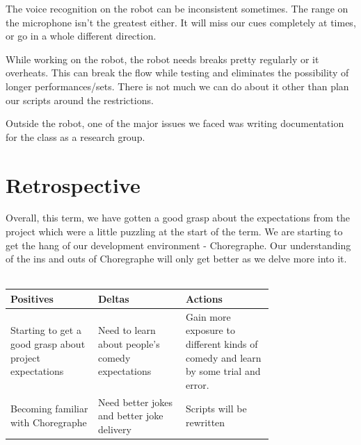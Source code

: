 \documentclass[onecolumn, draftclsnofoot,10pt, compsoc]{IEEEtran}
\begin{document}
The voice recognition on the robot can be inconsistent sometimes. The range on the microphone isn't the greatest either. It will miss our cues completely at times, or go in a whole different direction.

While working on the robot, the robot needs breaks pretty regularly or it overheats. This can break the flow while testing and eliminates the possibility of longer performances/sets. There is not much we can do about it other than plan our scripts around the restrictions.

Outside the robot, one of the major issues we faced was writing documentation for the class as a research group.

\section{Retrospective}

Overall, this term, we have gotten a good grasp about the expectations from the project which were a little puzzling at the start of the term. We are starting to get the hang of our development environment - Choregraphe. Our understanding of the ins and outs of Choregraphe will only get better as we delve more into it. \\ \\

\begin{tabular}{|p{0.25\linewidth}|p{0.25\linewidth}|p{0.25\linewidth}|}
\hline
\centering  Positives &
\centering Deltas &
\centering Actions \tabularnewline
\hline

Starting to get a good grasp about project expectations &
Need to learn about people's comedy expectations &
Gain more exposure to different kinds of comedy and learn by some trial and error. \\
\hline
Becoming familiar with Choregraphe &
Need better jokes and better joke delivery &
Scripts will be rewritten \\
\hline



\end{tabular}

\pagebreak


% 
% 
\end{document}
